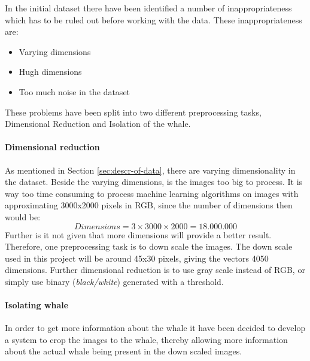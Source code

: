 In the initial dataset there have been identified a number of inappropriateness which has to be ruled out before working with the data.
These inappropriateness are:
\begin{itemize}
\item Varying dimensions
\item Hugh dimensions
\item Too much noise in the dataset
\end{itemize}
These problems have been split into two different preprocessing tasks, Dimensional Reduction and Isolation of the whale.

\paragraph{Dimensional reduction}
As mentioned in Section \ref{sec:descr-of-data}, there are varying dimensionality in the dataset. Beside the varying dimensions, is the images too big to process. It is way too time consuming to process machine learning algorithms on images with approximating 3000x2000 pixels in RGB, since the number of dimensions then would be:
\begin{equation}
Dimensions = 3 \times 3000 \times 2000=18.000.000
\end{equation} 
Further is it not given that more dimensions will provide a better result.
Therefore, one preprocessing task is to down scale the images.
The down scale used in this project will be around 45x30 pixels, giving the vectors 4050 dimensions.
Further dimensional reduction is to use gray scale instead of RGB, or simply use binary (\emph{black/white}) generated with a threshold.

\paragraph{Isolating whale}

In order to get more information about the whale it have been decided to develop a system to crop the images to the whale, thereby allowing more information about the actual whale being present in the down scaled images.

